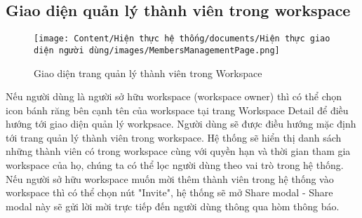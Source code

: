 \subsection{Giao diện quản lý thành viên trong workspace}

\begin{figure}[H]
    \centering
    \texttt{[image: Content/Hiện thực hệ thống/documents/Hiện thực giao diện người dùng/images/MembersManagementPage.png]}
    \vspace{0.5cm}
    \caption{Giao diện trang quản lý thành viên trong Workspace}
    \label{fig: Giao diện trang quản lý thành viên trong Workspace}
\end{figure}

Nếu người dùng là người sở hữu workspace (workspace owner) thì có thể chọn icon bánh răng bên cạnh tên của workspace tại trang Workspace Detail để điều hướng tới giao diện quản lý workpsace. Người dùng sẽ được điều hướng mặc định tới trang quản lý thành viên trong workspace. Hệ thống sẽ hiển thị danh sách những thành viên có trong workspace cùng với quyền hạn và thời gian tham gia workspace của họ, chúng ta có thể lọc người dùng theo vai trò trong hệ thống. Nếu người sở hữu workspace muốn mời thêm thành viên trong hệ thống vào workspace thì có thể chọn nút "Invite", hệ thống sẽ mở Share modal - Share modal này sẽ gửi lời mời trực tiếp đến người dùng thông qua hòm thông báo.